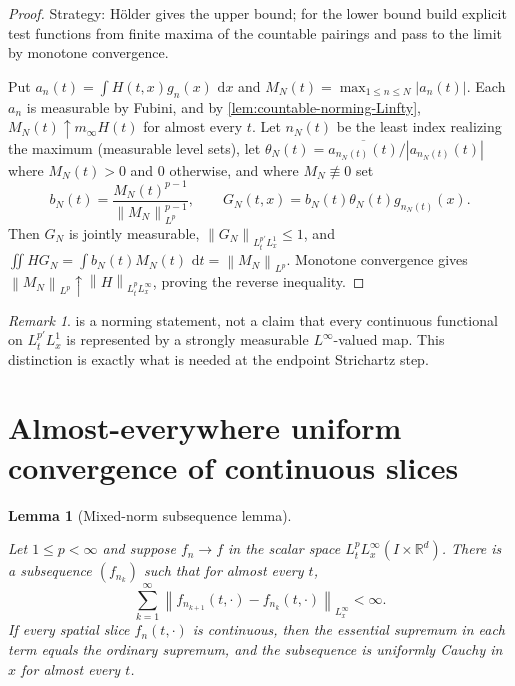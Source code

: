 \documentclass[11pt,oneside]{book}
\providecommand{\uses}[1]{}
\newtheorem{lemma}[theorem]{Lemma}
\theoremstyle{definition}
\theoremstyle{remark}
\newtheorem{remark}[theorem]{Remark}
\newcommand{\R}{\mathbb R}
\newcommand{\1}{\mathbf 1}
\newcommand{\dd}{\,\mathrm d}
\newcommand{\norm}[1]{\left\lVert #1\right\rVert}
\newcommand{\abs}[1]{\left\lvert #1\right\rvert}
\begin{document}
\begin{proof}
\uses{def:scalar-mixed-norm, lem:countable-norming-Linfty}
Strategy: Hölder gives the upper bound; for the lower bound build explicit test functions from finite maxima of the countable pairings and pass to the limit by monotone convergence.

Put $a_n(t)=\int H(t,x)g_n(x)\,\dd x$ and $M_N(t)=\max_{1\le n\le N}\abs{a_n(t)}$. Each $a_n$ is measurable by Fubini, and by \cref{lem:countable-norming-Linfty}, $M_N(t)\uparrow m_\infty H(t)$ for almost every $t$. Let $n_N(t)$ be the least index realizing the maximum (measurable level sets), let $\theta_N(t)=\overline{a_{n_N(t)}(t)}/\abs{a_{n_N(t)}(t)}$ where $M_N(t)>0$ and $0$ otherwise, and where $M_N\not\equiv0$ set
\[
 b_N(t)=\frac{M_N(t)^{p-1}}{\norm{M_N}_{L^p}^{p-1}},\qquad G_N(t,x)=b_N(t)\theta_N(t)g_{n_N(t)}(x).
\]
Then $G_N$ is jointly measurable, $\norm{G_N}_{L^{p'}_tL^1_x}\le1$, and $\iint HG_N=\int b_N(t)M_N(t)\,\dd t=\norm{M_N}_{L^p}$. Monotone convergence gives $\norm{M_N}_{L^p}\uparrow\norm{H}_{L^p_tL^\infty_x}$, proving the reverse inequality.
\end{proof}

\begin{remark}
 is a norming statement, not a claim that every continuous functional on $L^{p'}_tL^1_x$ is represented by a strongly measurable $L^\infty$-valued map. This distinction is exactly what is needed at the endpoint Strichartz step.
\end{remark}

\section{Almost-everywhere uniform convergence of continuous slices}

\begin{lemma}[Mixed-norm subsequence lemma]\label{lem:mixed-subsequence-uniform}
\uses{def:scalar-mixed-norm, lem:scalar-endpoint-complete}
Let $1\le p<\infty$ and suppose $f_n\to f$ in the scalar space $L^p_tL^\infty_x(I\times\R^d)$. There is a subsequence $(f_{n_k})$ such that for almost every $t$,
\[
 \sum_{k=1}^\infty\norm{f_{n_{k+1}}(t,\cdot)-f_{n_k}(t,\cdot)}_{L^\infty_x}<\infty.
\]
If every spatial slice $f_n(t,\cdot)$ is continuous, then the essential supremum in each term equals the ordinary supremum, and the subsequence is uniformly Cauchy in $x$ for almost every $t$.
\end{lemma}
\end{document}
